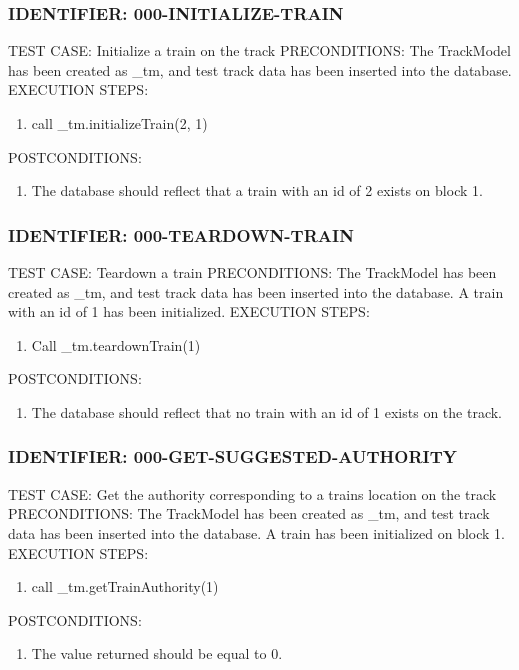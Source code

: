 \documentclass{scrreprt}
\begin{document}
\subsubsection{IDENTIFIER: 000-INITIALIZE-TRAIN}
TEST CASE: Initialize a train on the track
PRECONDITIONS: The TrackModel has been created as _tm, and test track data has been inserted into the database.
EXECUTION STEPS:
\begin{enumerate}
	\item call _tm.initializeTrain(2, 1)
\end{enumerate}
POSTCONDITIONS:
\begin{enumerate}
	\item The database should reflect that a train with an id of 2 exists on block 1.
\end{enumerate}

\subsubsection{IDENTIFIER: 000-TEARDOWN-TRAIN}
TEST CASE: Teardown a train
PRECONDITIONS: The TrackModel has been created as _tm, and test track data has been inserted into the database. A train with an id of 1 has been initialized.
EXECUTION STEPS:
\begin{enumerate}
	\item Call _tm.teardownTrain(1)
\end{enumerate}
POSTCONDITIONS:
\begin{enumerate}
	\item The database should reflect that no train with an id of 1 exists on the track.
\end{enumerate}

\subsubsection{IDENTIFIER: 000-GET-SUGGESTED-AUTHORITY}
TEST CASE: Get the authority corresponding to a trains location on the track
PRECONDITIONS: The TrackModel has been created as _tm, and test track data has been inserted into the database. A train has been initialized on block 1.
EXECUTION STEPS:
\begin{enumerate}
	\item call _tm.getTrainAuthority(1)
\end{enumerate}
POSTCONDITIONS:
\begin{enumerate}
	\item The value returned should be equal to 0.
\end{enumerate}
\end{document}
